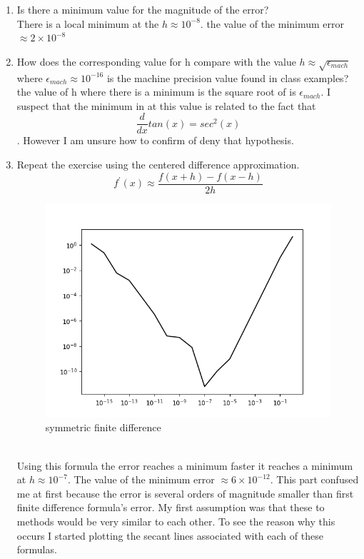 \documentclass{article}
\begin{document}
    \begin{enumerate}
        \item Is there a minimum value for the magnitude of the error?
        \\ There is a local minimum at the $ h \approx 10^{-8} $.   the value of the minimum error $\approx 2 \times 10^{-8}$
        \item How does the corresponding value for h compare with the value $ h \approx \sqrt{\epsilon_{mach}}$ where $\epsilon_{mach} \approx 10^{-16}$ is the machine precision value found in class examples? \\
        the value of h where there is a minimum is the square root of is $\epsilon_{mach}$. I suspect that the minimum in at this value is related to the fact that $$\frac{d}{dx}tan(x)=sec^{2}(x)$$. However I am unsure how to confirm of deny that hypothesis.  
        \item Repeat the exercise using the centered difference approximation.
        $$ f^{\prime}(x) \approx \frac{f(x+h)-f(x-h)}{2h}$$
        \pagebreak
        \begin{figure}[hbt!]
        	\centering
        	\includegraphics[width=.75\linewidth]{finite_diff2png.png}
        	\caption{ symmetric finite difference}
        	\label{fig: symmetric finite diffrence}
    	\end{figure}
        \\ Using this formula the error reaches a minimum faster it reaches a minimum at $ h \approx 10^{-7} $. The value of the minimum error $\approx 6 \times 10^{-12} $. This part confused me at first because the error is several orders of magnitude smaller than first finite difference formula's error. My first assumption was that these to methods would be very similar to each other. To see the reason why this occurs I started plotting the secant lines associated with each of these formulas.

\end{enumerate}
\end{document}

